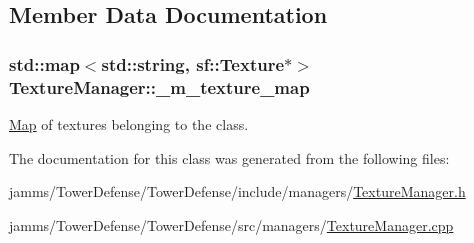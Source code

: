 \subsection{Member Data Documentation}
\hypertarget{class_texture_manager_a78bfaa7b400c1229762b49af63913752}{
\subsubsection[{\+\_\+m\+\_\+texture\+\_\+map}]{\setlength{\rightskip}{0pt plus 5cm}std\+::map$<$std\+::string, sf\+::\+Texture$\ast$$>$ Texture\+Manager\+::\+\_\+m\+\_\+texture\+\_\+map\hspace{0.3cm}{\ttfamily [private]}}}\label{class_texture_manager_a78bfaa7b400c1229762b49af63913752}


\hyperlink{class_map}{Map} of textures belonging to the class. 



The documentation for this class was generated from the following files\+:\begin{DoxyCompactItemize}
\item 
jamms/\+Tower\+Defense/\+Tower\+Defense/include/managers/\hyperlink{_texture_manager_8h}{Texture\+Manager.\+h}\item 
jamms/\+Tower\+Defense/\+Tower\+Defense/src/managers/\hyperlink{_texture_manager_8cpp}{Texture\+Manager.\+cpp}\end{DoxyCompactItemize}

